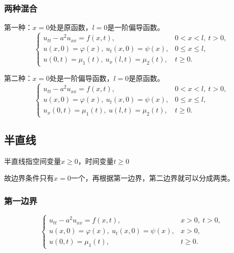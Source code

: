 \documentclass[12pt,a4paper]{article}
\numberwithin{subsection}{section}
\numberwithin{subsubsection}{subsection}
\theoremstyle{plain}
\theoremstyle{definition}
\theoremstyle{remark}
\begin{document}
		
		\subsubsection{两种混合}
	第一种：$x=0$处是原函数，$ l=0$是一阶偏导函数。
		\begin{equation}\label{The bounded wave equation with mixed boundary conditions_1}
			\begin{cases}
				u_{tt} - a^2 u_{xx} = f(x, t), & 0 < x < l, \ t > 0, \\
				u(x, 0) = \varphi(x), \ u_t(x, 0) = \psi(x), & 0 \leq x \leq l, \\
				u(0, t) = \mu_1(t), \ u_x(l, t) = \mu_2(t), & t \geq 0.
			\end{cases}
			\end{equation}
		
			第二种：$x=0$处是一阶偏导函数，$ l=0$是原函数。
		\begin{equation}\label{The bounded wave equation with mixed boundary conditions_2}
			\begin{cases}
				u_{tt} - a^2 u_{xx} = f(x, t), & 0 < x < l, \ t > 0, \\
				u(x, 0) = \varphi(x), \ u_t(x, 0) = \psi(x), & 0 \leq x \leq l, \\
				u_x(0, t) = \mu_1(t), \ u(l, t) = \mu_2(t), & t \geq 0.
			\end{cases}
				\end{equation}
				
		
		
\subsection{半直线}
半直线指空间变量$x \geq 0$，时间变量$t \geq 0$

故边界条件只有$x=0$一个，再根据第一边界，第二边界就可以分成两类。
\subsubsection{第一边界}
\begin{equation}\label{The wave equation on a half-line with Dirichlet boundary conditions}
	\begin{cases}
		u_{tt} - a^2 u_{xx} = f(x, t), & x > 0, \ t > 0, \\
		u(x, 0) = \varphi(x), \ u_t(x, 0) = \psi(x), & x > 0, \\
     	u(0, t) = \mu_1(t), & t \geq 0.
	\end{cases}
	\end{equation}
	
\end{document}
